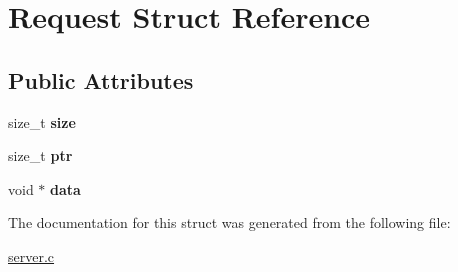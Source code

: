 \hypertarget{structRequest}{\section{\-Request \-Struct \-Reference}
\label{structRequest}
}
\subsection*{\-Public \-Attributes}
\begin{DoxyCompactItemize}
\item 
\hypertarget{structRequest_a8d93768bdfc381973d53d7334aa683be}{size\-\_\-t {\bfseries size}}\label{structRequest_a8d93768bdfc381973d53d7334aa683be}

\item 
\hypertarget{structRequest_add10eeb7b4e05e76bc6f99f8371d5887}{size\-\_\-t {\bfseries ptr}}\label{structRequest_add10eeb7b4e05e76bc6f99f8371d5887}

\item 
\hypertarget{structRequest_a04b0cc187654cc20a1d036917bcad878}{void $\ast$ {\bfseries data}}\label{structRequest_a04b0cc187654cc20a1d036917bcad878}

\end{DoxyCompactItemize}


\-The documentation for this struct was generated from the following file\-:\begin{DoxyCompactItemize}
\item 
\hyperlink{server_8c}{server.\-c}\end{DoxyCompactItemize}

